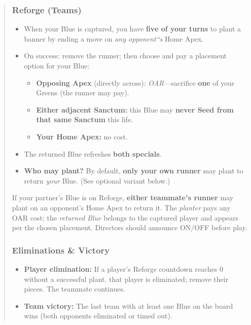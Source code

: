 \documentclass[11pt]{article}
\begin{document}
\begin{quote}
\subsubsection*{Reforge (Teams)}
\begin{itemize}[leftmargin=1.3em,itemsep=0.25em]
  \item When your Blue is captured, you have \textbf{five of your turns} to plant a banner by ending a move on \emph{any opponent``s} Home Apex.
  \item On success: remove the runner; then choose and pay a placement option for your Blue:
  \begin{itemize}[leftmargin=1.3em,itemsep=0.15em]
    \item \textbf{Opposing Apex} (directly across): \textit{OAR}---sacrifice \textbf{one} of your Greens (the runner may pay).
    \item \textbf{Either adjacent Sanctum:} this Blue may \textbf{never Seed from that same Sanctum} this life.
    \item \textbf{Your Home Apex:} no cost.
  \end{itemize}
  \item The returned Blue refreshes \textbf{both specials}.
  \item \textbf{Who may plant?} By default, \textbf{only your own runner} may plant to return \emph{your} Blue. (See optional variant below.)
\end{itemize}

\begin{tcolorbox}[enhanced,breakable,title={Variant --- Ally Plant Assist (Optional)},
  colback=white,colframe=royal,boxrule=0.8pt]
\small
If your partner's Blue is on Reforge, \textbf{either teammate's runner} may plant on an opponent's Home Apex to return it. The \emph{planter} pays any OAR cost; the \emph{returned Blue} belongs to the captured player and appears per the chosen placement. Directors should announce ON/OFF before play.
\end{tcolorbox}

\subsubsection*{Eliminations \& Victory}
\begin{itemize}[leftmargin=1.3em,itemsep=0.25em]
  \item \textbf{Player elimination:} If a player's Reforge countdown reaches 0 without a successful plant, that player is eliminated; remove their pieces. The teammate continues.
  \item \textbf{Team victory:} The last team with at least one Blue on the board wins (both opponents eliminated or timed out).
\end{itemize}


\end{quote}
\end{document}
